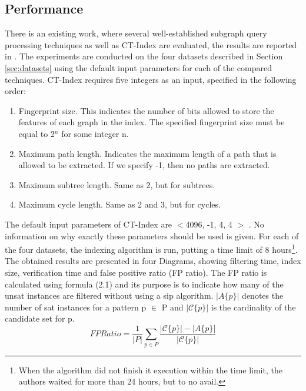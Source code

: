 \documentclass{l4proj}
\newcommand{\fancyC}{\mathcal{C}}
\begin{document}
\subsection{Performance}
\label{subsec:ctindexEval}

There is an existing work, where several well-established subgraph query processing techniques as well as CT-Index are evaluated, the results are reported in \cite{foteini}. The experiments are conducted on the four datasets described in Section \ref{sec:datasets} using the default input parameters for each of the compared techniques. CT-Index requires five integers as an input, specified in the following order:
\begin{enumerate}
\item Fingerprint size. This indicates the number of bits allowed to store the features of each graph in the index. The specified fingerprint size must be equal to 2$^{n}$ for some integer n.
\item Maximum path length. Indicates the maximum length of a path that is allowed to be extracted. If we specify -1, then no paths are extracted.
\item Maximum subtree length. Same as 2, but for subtrees.
\item Maximum cycle length. Same as 2 and 3, but for cycles.
\end{enumerate}

The default input parameters of CT-Index are $<$4096, -1, 4, 4 $>$ \cite{ctindex, foteini}. No information on why exactly these parameters should be used is given. For each of the four datasets, the indexing algorithm is run, putting a time limit of 8 hours\footnote{When the algorithm did not finish it execution within the time limit, the authors waited for more than 24 hours, but to no avail.}. The obtained results are presented in four Diagrams, showing filtering time, index size, verification time and false positive ratio (FP ratio). The FP ratio is calculated using formula (2.1) and its purpose is to indicate how many of the \gls{unsat} instances are filtered without using a \gls{sip} algorithm. \textit{$|A\{p\}|$} denotes the number of \gls{sat} instances for a pattern p $\in$ P and \textit{$|\fancyC\{p\}|$} is the cardinality of the candidate set for p.
\begin{equation}
\label{eq:fpratio}
FP Ratio = \frac{1}{|P|} \sum_{p \in P} \frac{|\fancyC\{p\}| - |A\{p\}|}{|\fancyC\{p\}|}
\end{equation}
\end{document}
